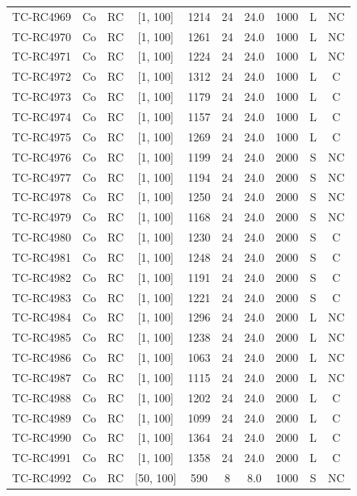 \begin{longtable}{lccccccccc}
TC-RC4969 & Co & RC & [1, 100] & 1214 & 24 & 24.0 & 1000 & L & NC \\
TC-RC4970 & Co & RC & [1, 100] & 1261 & 24 & 24.0 & 1000 & L & NC \\
TC-RC4971 & Co & RC & [1, 100] & 1224 & 24 & 24.0 & 1000 & L & NC \\
TC-RC4972 & Co & RC & [1, 100] & 1312 & 24 & 24.0 & 1000 & L & C \\
TC-RC4973 & Co & RC & [1, 100] & 1179 & 24 & 24.0 & 1000 & L & C \\
TC-RC4974 & Co & RC & [1, 100] & 1157 & 24 & 24.0 & 1000 & L & C \\
TC-RC4975 & Co & RC & [1, 100] & 1269 & 24 & 24.0 & 1000 & L & C \\
TC-RC4976 & Co & RC & [1, 100] & 1199 & 24 & 24.0 & 2000 & S & NC \\
TC-RC4977 & Co & RC & [1, 100] & 1194 & 24 & 24.0 & 2000 & S & NC \\
TC-RC4978 & Co & RC & [1, 100] & 1250 & 24 & 24.0 & 2000 & S & NC \\
TC-RC4979 & Co & RC & [1, 100] & 1168 & 24 & 24.0 & 2000 & S & NC \\
TC-RC4980 & Co & RC & [1, 100] & 1230 & 24 & 24.0 & 2000 & S & C \\
TC-RC4981 & Co & RC & [1, 100] & 1248 & 24 & 24.0 & 2000 & S & C \\
TC-RC4982 & Co & RC & [1, 100] & 1191 & 24 & 24.0 & 2000 & S & C \\
TC-RC4983 & Co & RC & [1, 100] & 1221 & 24 & 24.0 & 2000 & S & C \\
TC-RC4984 & Co & RC & [1, 100] & 1296 & 24 & 24.0 & 2000 & L & NC \\
TC-RC4985 & Co & RC & [1, 100] & 1238 & 24 & 24.0 & 2000 & L & NC \\
TC-RC4986 & Co & RC & [1, 100] & 1063 & 24 & 24.0 & 2000 & L & NC \\
TC-RC4987 & Co & RC & [1, 100] & 1115 & 24 & 24.0 & 2000 & L & NC \\
TC-RC4988 & Co & RC & [1, 100] & 1202 & 24 & 24.0 & 2000 & L & C \\
TC-RC4989 & Co & RC & [1, 100] & 1099 & 24 & 24.0 & 2000 & L & C \\
TC-RC4990 & Co & RC & [1, 100] & 1364 & 24 & 24.0 & 2000 & L & C \\
TC-RC4991 & Co & RC & [1, 100] & 1358 & 24 & 24.0 & 2000 & L & C \\
TC-RC4992 & Co & RC & [50, 100] & 590 & 8 & 8.0 & 1000 & S & NC \\

\end{longtable}
